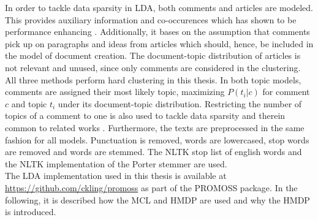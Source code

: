 In order to tackle data sparsity in LDA, both comments and articles are modeled. This provides auxiliary information and co-occurences which has shown to be performance enhancing \cite{DBLP:conf/ecir/AkerKBPBHG16}. Additionally, it bases on the assumption that comments pick up on paragraphs and ideas from articles which should, hence, be included in the model of document creation. The document-topic distribution of articles is not relevant and unused, since only comments are considered in the clustering.
All three methods perform hard clustering in this thesis. In both topic models, comments are assigned their most likely topic, maximizing $P(t_i|c)$ for comment $c$ and topic $t_i$ under its document-topic distribution. Restricting the number of topics of a comment to one is also used to tackle data sparsity \cite{DBLP:journals/tacl/NguyenBDJ15} and therein common to related works \cite{DBLP:conf/ecir/AkerKBPBHG16, DBLP:conf/cikm/MaSYC12, llewellyn_grover_oberlander, DBLP:conf/icwsm/KhabiriCH11}.
Furthermore, the texts are preprocessed in the same fashion for all models. Punctuation is removed, words are lowercased, stop words are removed and words are stemmed. The NLTK stop list of english words and the NLTK implementation of the Porter stemmer \cite{Porter:1997:ASS:275537.275705} are used. \\
The LDA implementation used in this thesis is available at \url{https://github.com/ckling/promoss} as part of the PROMOSS package. In the following, it is described how the MCL and HMDP are used and why the HMDP is introduced.

